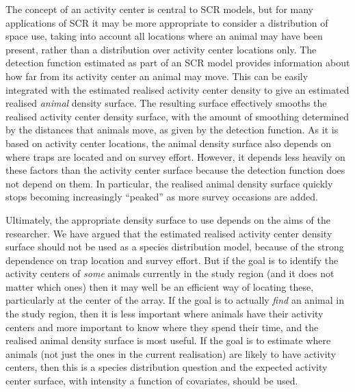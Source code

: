 \documentclass[a4paper,12pt]{article}
\begin{document}
The concept of an activity center is central to SCR models, but for many applications of SCR it may be more appropriate to consider a distribution of space use, taking into account all locations where an animal may have been present, rather than a distribution over activity center locations only. The detection function estimated as part of an SCR model provides information about how far from its activity center an animal may move. This can be easily integrated with the estimated realised activity center density to give an estimated realised {\it animal} density surface. The resulting surface effectively smooths the realised activity center density surface, with the amount of smoothing determined by the distances that animals move, as given by the detection function. As it is based on activity center locations, the animal density surface also depends on where traps are located and on survey effort. However, it depends less heavily on these factors than the activity center surface because the detection function does not depend on them. In particular, the realised animal density surface quickly stops becoming increasingly ``peaked'' as more survey occasions are added.

Ultimately, the appropriate density surface to use depends on the aims of the researcher. We have argued that the estimated realised activity center density surface should not be used as a species distribution model, because of the strong dependence on trap location and survey effort. But if the goal is to identify the activity centers of {\it some} animals currently in the study region (and it does not matter which ones) then it may well be an efficient way of locating these, particularly at the center of the array. If the goal is to actually {\it find} an animal in the study region, then it is less important where animals have their activity centers and more important to know where they spend their time, and the realised animal density surface is most useful. If the goal is to estimate where animals (not just the ones in the current realisation) are likely to have activity centers, then this is a species distribution question and the expected activity center surface, with intensity a function of covariates, should be used.
\end{document}
